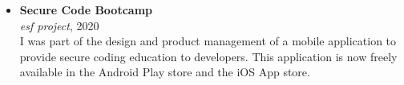\begin{itemize}
    \item 
    \textbf{Secure Code Bootcamp}\\
    \emph{\gls{esf} project}, 2020\\
    I was part of the design and product management of a mobile application to provide secure coding education to developers.
    This application is now freely available in the Android Play store and the iOS App store.
    
\end{itemize}


